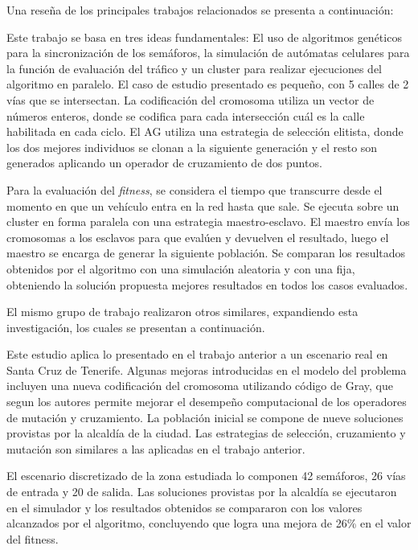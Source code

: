 Una reseña de los principales trabajos relacionados se presenta a continuación:


\begin{itemize}
\begin{item}

  
Este trabajo se basa en tres ideas fundamentales: El uso de algoritmos genéticos para la sincronización de los semáforos, la simulación de autómatas celulares para la función de evaluación del tráfico y un cluster para realizar ejecuciones del algoritmo en paralelo.
El caso de estudio presentado es pequeño, con 5 calles de 2 vías que se intersectan. La codificación del cromosoma utiliza un vector de números enteros, donde se codifica para cada intersección cuál es la calle habilitada en cada ciclo. El AG utiliza una estrategia de selección elitista, donde los dos mejores individuos se clonan a la siguiente generación y el resto son generados aplicando un operador de cruzamiento de dos puntos.

Para la evaluación del \emph{fitness}, se considera el tiempo que transcurre desde el momento en que un vehículo entra en la red hasta que sale. Se ejecuta sobre un cluster en forma paralela con una estrategia maestro-esclavo. El maestro envía los cromosomas a los esclavos para que evalúen y devuelven el resultado, luego el maestro se encarga de generar la siguiente población.
Se comparan los resultados obtenidos por el algoritmo con una simulación aleatoria y con una fija, obteniendo la solución propuesta mejores resultados en todos los casos evaluados.
	
El mismo grupo de trabajo realizaron otros similares, expandiendo esta investigación, los cuales se presentan a continuación.
\end{item}
	
\begin{item}

Este estudio aplica lo presentado en el trabajo anterior a un escenario real en Santa Cruz de Tenerife. Algunas mejoras introducidas en el modelo del problema incluyen una nueva codificación del cromosoma utilizando código de Gray, que segun los autores permite mejorar el desempeño computacional de los operadores de mutación y cruzamiento. La población inicial se compone de nueve soluciones provistas por la alcaldía de la ciudad. Las estrategias de selección, cruzamiento y mutación son similares a las aplicadas en el trabajo anterior.

El escenario discretizado de la zona estudiada lo componen 42 semáforos, 26 vías de entrada y 20 de salida. Las soluciones provistas por la alcaldía se ejecutaron en el simulador y los resultados obtenidos se compararon con los valores alcanzados  por el algoritmo, concluyendo que logra una mejora de 26\% en el valor del fitness.


\end{item}
\end{itemize}
